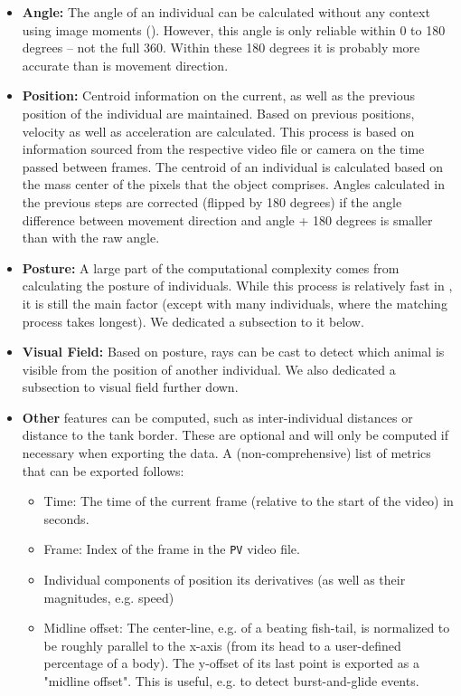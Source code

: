 \documentclass[9pt,lineno]{elife}
\newcommand{\TRex}{\protect\path{TRex}}
\begin{document}
\begin{appendixbox}
\begin{itemize}
    \item \textbf{Angle:} The angle of an individual can be calculated without any context using image moments (\cite{hu1962visual}). However, this angle is only reliable within 0 to 180 degrees -- not the full 360. Within these 180 degrees it is probably more accurate than is movement direction.
    \item \textbf{Position:} Centroid information on the current, as well as the previous position of the individual are maintained. Based on previous positions, velocity as well as acceleration are calculated. This process is based on information sourced from the respective video file or camera on the time passed between frames. The centroid of an individual is calculated based on the mass center of the pixels that the object comprises. Angles calculated in the previous steps are corrected (flipped by 180 degrees) if the angle difference between movement direction and angle + 180 degrees is smaller than with the raw angle. \item \textbf{Posture:} A large part of the computational complexity comes from calculating the posture of individuals. While this process is relatively fast in \TRex{}, it is still the main factor (except with many individuals, where the matching process takes longest). We dedicated a subsection to it below.
    \item \textbf{Visual Field:} Based on posture, rays can be cast to detect which animal is visible from the position of another individual. We also dedicated a subsection to visual field further down.
    \item \textbf{Other} features can be computed, such as inter-individual distances or distance to the tank border. These are optional and will only be computed if necessary when exporting the data. A (non-comprehensive) list of metrics that can be exported follows:
        \begin{itemize}
            \item Time: The time of the current frame (relative to the start of the video) in seconds.
            \item Frame: Index of the frame in the \texttt{PV} video file.
            \item Individual components of position its derivatives (as well as their magnitudes, e.g. speed)
            \item Midline offset: The center-line, e.g. of a beating fish-tail, is normalized to be roughly parallel to the x-axis (from its head to a user-defined percentage of a body). The y-offset of its last point is exported as a "midline offset". This is useful, e.g. to detect burst-and-glide events.

\end{itemize}
\end{itemize}
\end{appendixbox}
\end{document}
